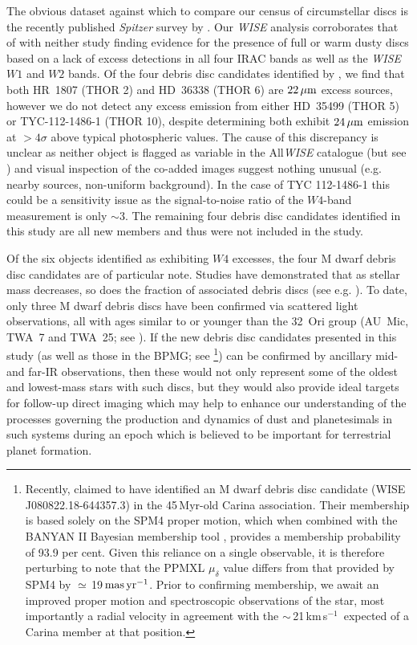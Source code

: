 \documentclass[usenatbib]{mnras}
\newcommand{\kms}{\textrm{km\,s$^{-1}$}}
\begin{document}
The obvious dataset against which to compare our census of
circumstellar discs is the recently published \emph{Spitzer} survey
by \cite{Shvonski16}. Our \emph{WISE} analysis corroborates that
of \citeauthor{Shvonski16} with neither study finding evidence for the
presence of full or warm dusty discs based on a lack of excess detections
in all four IRAC bands as well as the \emph{WISE} $W1$ and $W2$ bands. Of the four debris disc
candidates identified by \citeauthor{Shvonski16}, we find that both HR~1807 (THOR 2)
and HD~36338 (THOR 6) are $22\,\rm{\mu m}$ excess sources, however we do not
detect any excess emission from either HD~35499 (THOR 5) or TYC-112-1486-1 (THOR 10),
despite \citeauthor{Shvonski16} determining both exhibit $24\,\rm{\mu m}$
emission at $>4\sigma$ above typical photospheric values.
The cause of this discrepancy is unclear as neither
object is flagged as variable in the All\emph{WISE} catalogue (but see \citealp{Melis12})
and visual inspection of the co-added images suggest nothing unusual (e.g. nearby
sources, non-uniform background). In the case of TYC 112-1486-1 this could be
a sensitivity issue as the signal-to-noise ratio of the $W4$-band measurement is
only $\sim$3. The remaining four debris disc candidates
identified in this study are all new members and thus were not included in
the \citeauthor{Shvonski16} study.

Of the six objects identified as exhibiting $W4$ excesses,
the four M dwarf debris disc candidates are of particular note. Studies
have demonstrated that as stellar mass decreases, so does the fraction of
associated debris discs (see e.g. \citealp{Lestrade09}). To date,
only three M dwarf debris discs have been confirmed via scattered
light observations, all with ages similar to or younger than the 32~Ori
group (AU~Mic, TWA~7 and TWA~25; see
\citealp{Choquet16}). If the new debris disc candidates presented in this study
(as well as those in the BPMG; see \citealp{Binks16b}\footnote{Recently, \cite{Silverberg16}
claimed to have identified an M dwarf debris disc candidate
(WISE J080822.18-644357.3) in the 45\,Myr-old Carina
association. Their membership is based solely on the SPM4 proper motion,
which when combined with the BANYAN II Bayesian membership tool \citep{Gagne14}, provides a membership probability of
93.9 per cent. Given this reliance on a single observable, it is therefore perturbing to note that the PPMXL
$\mu_{\delta}$ value differs from that provided by SPM4 by $\simeq$\,19\,$\rm{mas\,yr^{-1}}$.
Prior to confirming membership, we await an improved proper motion and spectroscopic observations of the star,
most importantly a radial velocity in agreement with the $\sim$\,21\,\kms\ expected of a Carina member at that position.
})
can be confirmed by ancillary
mid- and far-IR observations, then these would not only represent some
of the oldest and lowest-mass stars with such discs, but they would also
provide ideal targets
for follow-up direct imaging which may help to enhance our understanding
of the processes governing the production and dynamics of dust and
planetesimals in such systems during an epoch which is believed to be
important for terrestrial planet formation.
\end{document}
